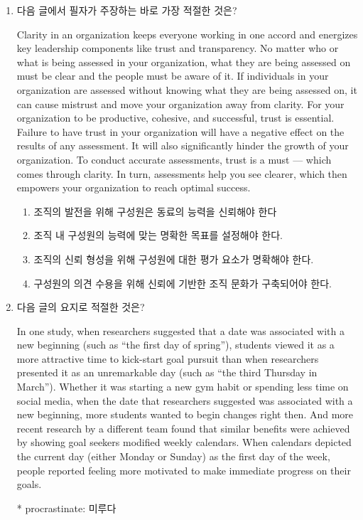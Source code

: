 \documentclass[a4paper, twocolumn]{oblivoir}
\begin{document}
    \begin{enumerate}
        \item 다음 글에서 필자가 주장하는 바로 가장 적절한 것은?
        
                Clarity in an organization keeps everyone working in one
        accord and energizes key leadership components like trust and
        transparency. No matter who or what is being assessed in
        your organization, what they are being assessed on must be
        clear and the people must be aware of it. If individuals in your
        organization are assessed without knowing what they are being
        assessed on, it can cause mistrust and move your organization
        away from clarity. For your organization to be productive,
        cohesive, and successful, trust is essential. Failure to have
        trust in your organization will have a negative effect on the
        results of any assessment. It will also significantly hinder the
        growth of your organization. To conduct accurate assessments,
        trust is a must — which comes through clarity. In turn,
        assessments help you see clearer, which then empowers your
        organization to reach optimal success.

        \begin{enumerate}
            \item 조직의 발전을 위해 구성원은 동료의 능력을 신뢰해야 한다
            \item 조직 내 구성원의 능력에 맞는 명확한 목표를 설정해야 한다.
            \item 조직의 신뢰 형성을 위해 구성원에 대한 평가 요소가 명확해야 한다.
            \item 구성원의 의견 수용을 위해 신뢰에 기반한 조직 문화가 구축되어야 한다.
        \end{enumerate}
        
        \pagebreak

        \item 다음 글의 요지로 적절한 것은? 
        
                In one study, when researchers suggested that a date was
        associated with a new beginning (such as “the first day of
        spring”), students viewed it as a more attractive time to
        kick-start goal pursuit than when researchers presented it as
        an unremarkable day (such as “the third Thursday in March”).
        Whether it was starting a new gym habit or spending less time
        on social media, when the date that researchers suggested was
        associated with a new beginning, more students wanted to begin
        changes right then. And more recent research by a different
        team found that similar benefits were achieved by showing goal
        seekers modified weekly calendars. When calendars depicted
        the current day (either Monday or Sunday) as the first day of
        the week, people reported feeling more motivated to make
        immediate progress on their goals.
        \begin{flushright}
            \small{* procrastinate: 미루다}
        \end{flushright}


\end{enumerate}
\end{document}
